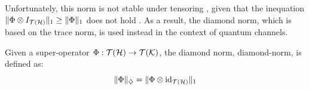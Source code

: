 


Unfortunately, this norm is not stable under tensoring , given that the inequation $ \lVert \Phi \otimes I_{\mathcal{T}(\mathcal{H})} \rVert_{1} \geq \lVert \Phi \rVert_{1}$ does not hold \cite{watrous2018theory}. As a result, the diamond norm, which is based on the trace norm, is used instead in the context of quantum channels. 

\begin{definition} \label{def:diamond_norm}
  Given a super-operator $\Phi: \mathcal{T}(\mathcal{H}) \to \mathcal{T}(\mathcal{K})$, the diamond norm, \gls{diamond-norm}, is defined as:
  \begin{equation*}  \label{eq:diamond_distance}
    \lVert \Phi \rVert_{\diamondsuit} =  \lVert \Phi \otimes \mathrm{id}_{\mathcal{T}(\mathcal{H})} \rVert_{1}
  \end{equation*}
\end{definition}


